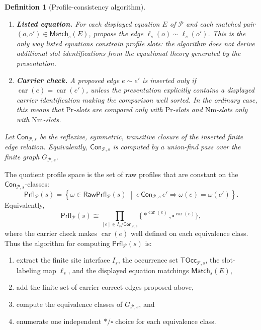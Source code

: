 \documentclass[11pt]{article}
\newcommand{\Proc}{\mathrm{Pr}}
\newcommand{\Nm}{\mathrm{Nm}}
\newcommand{\Prfl}{\mathsf{Prfl}}
\newcommand{\RawPrfl}{\mathsf{RawPrfl}}
\newcommand{\TOcc}{\mathsf{TOcc}}
\newcommand{\Match}{\mathsf{Match}}
\newcommand{\Con}{\mathsf{Con}}
\newtheorem{definition}{Definition}[section]
\begin{document}
\begin{definition}[Profile-consistency algorithm]
\begin{enumerate}[label=\textup{(\roman*)}]
  \item \textbf{Listed equation.} For each displayed equation
  \(E\) of \(\mathcal{P}\) and each matched pair
  \((o,o')\in\Match_s(E)\), propose the edge
  \(\ell_s(o)\sim\ell_s(o')\).  This is the only way listed equations constrain
  profile slots: the algorithm does not derive additional slot identifications
  from the equational theory generated by the presentation.

  \item \textbf{Carrier check.} A proposed edge \(e\sim e'\) is inserted only if
  \(\operatorname{car}(e)=\operatorname{car}(e')\), unless the presentation
  explicitly contains a displayed carrier identification making the comparison
  well sorted.  In the ordinary case, this means that \(\Proc\)-slots are
  compared only with \(\Proc\)-slots and \(\Nm\)-slots only with \(\Nm\)-slots.
\end{enumerate}

Let \(\Con_{\mathcal{P},s}\) be the reflexive, symmetric, transitive closure of
the inserted finite edge relation.  Equivalently, \(\Con_{\mathcal{P},s}\) is
computed by a union-find pass over the finite graph \(G_{\mathcal{P},s}\).
\end{definition}

The quotient profile space is the set of raw profiles that are constant on the
\(\Con_{\mathcal{P},s}\)-classes:
\[
  \Prfl_{\mathcal{P}}(s)
  =
  \left\{
    \omega\in\RawPrfl_{\mathcal{P}}(s)
    \;\middle|\;
    e\,\Con_{\mathcal{P},s}\,e'
    \Rightarrow
    \omega(e)=\omega(e')
  \right\}.
\]
Equivalently,
\[
  \Prfl_{\mathcal{P}}(s)
  \cong
  \prod_{[e]\in I_s/\Con_{\mathcal{P},s}}
  \{\ast^{\operatorname{car}(e)},\square^{\operatorname{car}(e)}\},
\]
where the carrier check makes \(\operatorname{car}(e)\) well defined on each
equivalence class.  Thus the algorithm for computing \(\Prfl_{\mathcal{P}}(s)\)
is:
\begin{enumerate}[label=\textup{(\arabic*)}]
  \item extract the finite site interface \(I_s\), the occurrence set
  \(\TOcc_{\mathcal{P},s}\), the slot-labeling map \(\ell_s\), and the displayed
  equation matchings \(\Match_s(E)\),
  \item add the finite set of carrier-correct edges proposed above,
  \item compute the equivalence classes of \(G_{\mathcal{P},s}\), and
  \item enumerate one independent \(\ast/\square\) choice for each equivalence
  class.
\end{enumerate}
\end{document}
